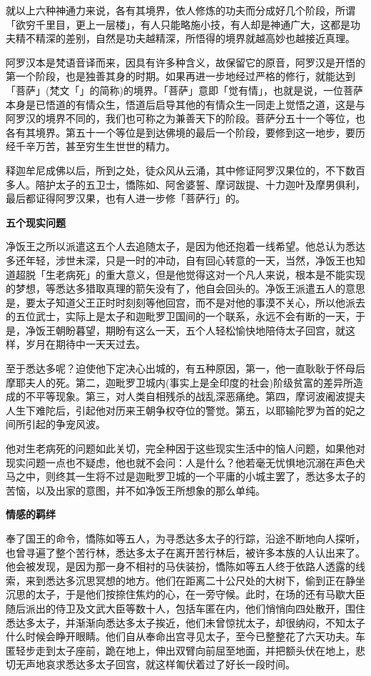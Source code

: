 \documentclass[12pt,twoside,openany]{book}
\newcommand{\mt}[1]{\textbullet \textbf{#1}}
\begin{document}
就以上六种神通力来说，各有其境界，依人修炼的功夫而分成好几个阶段，所谓「欲穷千里目，更上一层楼」，有人只能略施小技，有人却是神通广大，这都是功夫精不精深的差别，自然是功夫越精深，所悟得的境界就越高妙也越接近真理。

阿罗汉本是梵语音译而来，因具有许多种含义，故保留它的原音，阿罗汉是开悟的第一个阶段，也是独善其身的时期。如果再进一步地经过严格的修行，就能达到「菩萨」(梵文「」的简称)的境界。「菩萨」意即「觉有情」，也就是说，一位菩萨本身是已悟道的有情众生，悟道后启导其他的有情众生一同走上觉悟之道，这是与阿罗汉的境界不同的，我们也可称之为兼善天下的阶段。菩萨分五十一个等位，也各有其境界。第五十一个等位是到达佛境的最后一个阶段，要修到这一地步，要历经千辛万苦，甚至穷生生世世的精力。

释迦牟尼成佛以后，所到之处，徒众风从云涌，其中修证阿罗汉果位的，不下数百多人。陪护太子的五卫士，憍陈如、阿舍婆誓、摩诃跋提、十力迦叶及摩男俱利，最后都证得阿罗汉果，也有人进一步修「菩萨行」的。

\mt{五个现实问题}

净饭王之所以派遣这五个人去追随太子，是因为他还抱着一线希望。他总认为悉达多还年轻，涉世未深，只是一时的冲动，自有回心转意的一天，当然，净饭王也知道超脱「生老病死」的重大意义，但是他觉得这对一个凡人来说，根本是不能实现的梦想，等悉达多猎取真理的箭矢没有了，他自会回头的。净饭王派遣五人的意思是，要太子知道父王正时时刻刻等他回宫，而不是对他的事漠不关心，所以他派去的五位武士，实际上是太子和迦毗罗卫国间的一个联系，永远不会有断的一天，于是，净饭王朝盼暮望，期盼有这么一天，五个人轻松愉快地陪侍太子回宫，就这样，岁月在期待中一天天过去。

至于悉达多呢？迫使他下定决心出城的，有五种原因，第一，他一直耿耿于怀母后摩耶夫人的死。第二，迦毗罗卫城内(事实上是全印度的社会)阶级贫富的差异所造成的不平等现象。第三，对人类自相残杀的战乱深恶痛绝。第四，摩诃波阇波提夫人生下难陀后，引起他对历来王朝争权夺位的警觉。第五，以耶输陀罗为首的妃之间所引起的争宠风波。

他对生老病死的问题如此关切，完全种因于这些现实生活中的恼人问题，如果他对现实问题一点也不疑虑，他也就不会问：人是什么？他若毫无忧惧地沉溺在声色犬马之中，则终其一生将不过是迦毗罗卫城的一个平庸的小城主罢了，悉达多太子的苦恼，以及出家的意图，并不如净饭王所想象的那么单纯。

\mt{情感的羁绊}

奉了国王的命令，憍陈如等五人，为寻悉达多太子的行踪，沿途不断地向人探听，也曾寻遍了整个苦行林，悉达多太子在离开苦行林后，被许多本族的人认出来了。他会被发现，是因为那一身不相衬的马伕装扮，憍陈如等五人终于依路人透露的线索，来到悉达多沉思冥想的地方。他们在距离二十公尺处的大树下，偷到正在静坐沉思的太子，于是他们按捺住焦灼的心，在一旁守候。此时，在场的还有马歇大臣随后派出的侍卫及文武大臣等数十人，包括车匿在内，他们悄悄向四处散开，围住悉达多太子，并渐渐向悉达多太子挨近，他们未曾惊扰太子，却很纳闷，不知太子什么时候会睁开眼睛。他们自从奉命出宫寻见太子，至今已整整花了六天功夫。车匿轻步走到太子座前，跪在地上，伸出双臂向前屈至地面，并把额头伏在地上，悲切无声地哀求悉达多太子回宫，就这样匍伏着过了好长一段时间。
\end{document}

